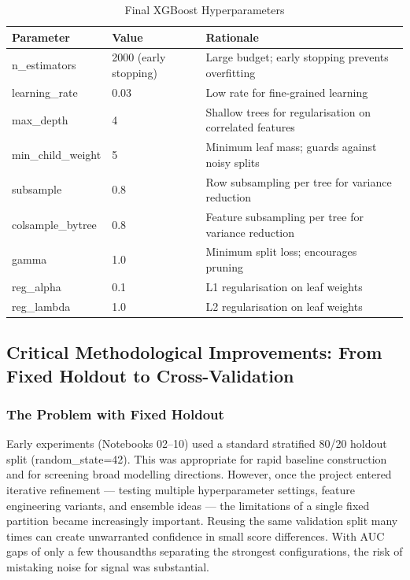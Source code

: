\documentclass[a4paper,11pt]{article}
\begin{document}
\begin{table}[H]
\centering
\caption{Final XGBoost Hyperparameters}
\label{tab:params}
\begin{tabular}{lll}
\toprule
\textbf{Parameter} & \textbf{Value} & \textbf{Rationale} \\
\midrule
n\_estimators & 2000 (early stopping) & Large budget; early stopping prevents overfitting \\
learning\_rate & 0.03 & Low rate for fine-grained learning \\
max\_depth & 4 & Shallow trees for regularisation on correlated features \\
min\_child\_weight & 5 & Minimum leaf mass; guards against noisy splits \\
subsample & 0.8 & Row subsampling per tree for variance reduction \\
colsample\_bytree & 0.8 & Feature subsampling per tree for variance reduction \\
gamma & 1.0 & Minimum split loss; encourages pruning \\
reg\_alpha & 0.1 & L1 regularisation on leaf weights \\
reg\_lambda & 1.0 & L2 regularisation on leaf weights \\
\bottomrule
\end{tabular}
\end{table}

\subsection{Critical Methodological Improvements: From Fixed Holdout to Cross-Validation}

\subsubsection{The Problem with Fixed Holdout}
Early experiments (Notebooks 02--10) used a standard stratified 80/20 holdout split (random\_state=42). This was appropriate for rapid baseline construction and for screening broad modelling directions. However, once the project entered iterative refinement --- testing multiple hyperparameter settings, feature engineering variants, and ensemble ideas --- the limitations of a single fixed partition became increasingly important. Reusing the same validation split many times can create unwarranted confidence in small score differences. With AUC gaps of only a few thousandths separating the strongest configurations, the risk of mistaking noise for signal was substantial.
\end{document}
